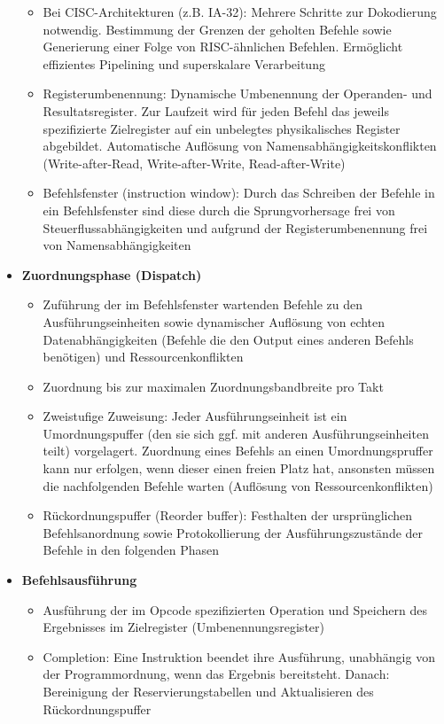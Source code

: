 \begin{itemize}
\begin{itemize}
		\item Bei CISC-Architekturen (z.B. IA-32): Mehrere Schritte zur Dokodierung notwendig. Bestimmung der Grenzen der geholten Befehle sowie Generierung einer Folge von RISC-ähnlichen Befehlen. Ermöglicht effizientes Pipelining und superskalare Verarbeitung
		\item Registerumbenennung: Dynamische Umbenennung der Operanden- und Resultatsregister. Zur Laufzeit wird für jeden Befehl das jeweils spezifizierte Zielregister auf ein unbelegtes physikalisches Register abgebildet. Automatische Auflösung von Namensabhängigkeitskonflikten (Write-after-Read, Write-after-Write, Read-after-Write)
		\item Befehlsfenster (instruction window): Durch das Schreiben der Befehle in ein Befehlsfenster sind diese durch die Sprungvorhersage frei von Steuerflussabhängigkeiten und aufgrund der Registerumbenennung frei von Namensabhängigkeiten
	\end{itemize}
	\item \textbf{Zuordnungsphase (Dispatch)}
	\begin{itemize}
		\item Zuführung der im Befehlsfenster wartenden Befehle zu den Ausführungseinheiten sowie dynamischer Auflösung von echten Datenabhängigkeiten (Befehle die den Output eines anderen Befehls benötigen) und Ressourcenkonflikten
		\item Zuordnung bis zur maximalen Zuordnungsbandbreite pro Takt
		\item Zweistufige Zuweisung: Jeder Ausführungseinheit ist ein Umordnungspuffer (den sie sich ggf. mit anderen Ausführungseinheiten teilt) vorgelagert. Zuordnung eines Befehls an einen Umordnungspruffer kann nur erfolgen, wenn dieser einen freien Platz hat, ansonsten müssen die nachfolgenden Befehle warten (Auflösung von Ressourcenkonflikten)
				\item Rückordnungspuffer (Reorder buffer): Festhalten der ursprünglichen Befehlsanordnung sowie Protokollierung der Ausführungszustände der Befehle in den folgenden Phasen
	\end{itemize}
	\item \textbf{Befehlsausführung}
	\begin{itemize}
		\item Ausführung der im Opcode spezifizierten Operation und Speichern des Ergebnisses im Zielregister (Umbenennungsregister)
		\item Completion: Eine Instruktion beendet ihre Ausführung, unabhängig von der Programmordnung, wenn das Ergebnis bereitsteht. Danach: Bereinigung der Reservierungstabellen und Aktualisieren des Rückordnungspuffer

\end{itemize}
\end{itemize}
